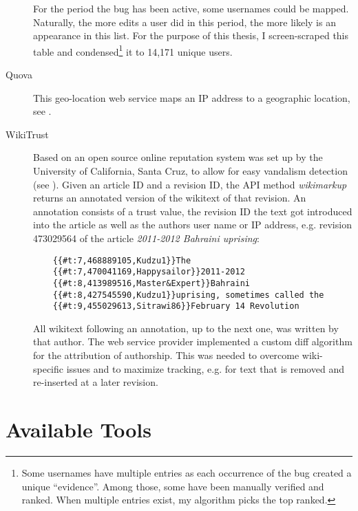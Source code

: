 \begin{description}
For the period the bug has been active, some usernames could be mapped.
Naturally, the more edits a user did in this period, the more likely is an appearance in this list.
For the purpose of this thesis, I screen-scraped this table and condensed\footnote{Some usernames have multiple entries as each occurrence of the bug created a unique ``evidence''. Among those, some have been manually verified and ranked. When multiple entries exist, my algorithm picks the top ranked.} it to 14,171 unique users.
\item[Quova] This geo-location web service maps an IP address to a geographic location, see .
\item[WikiTrust] Based on \textcite{adler2008assigning} an open source online reputation system was set up by the University of California, Santa Cruz, to allow for easy vandalism detection (see ).
Given an article ID and a revision ID, the API method \emph{wikimarkup} returns an annotated version of the wikitext of that revision.
An annotation consists of a trust value, the revision ID the text got introduced into the article as well as the authors user name or IP address, e.g. revision 473029564 of the article \emph{2011-2012 Bahraini uprising}:
\begin{lstlisting}
	{{#t:7,468889105,Kudzu1}}The 
	{{#t:7,470041169,Happysailor}}2011-2012 
	{{#t:8,413989516,Master&Expert}}Bahraini 
	{{#t:8,427545590,Kudzu1}}uprising, sometimes called the
	{{#t:9,455029613,Sitrawi86}}February 14 Revolution 
\end{lstlisting}
All wikitext following an annotation, up to the next one, was written by that author.
The web service provider implemented a custom diff algorithm for the attribution of authorship.
This was needed to overcome wiki-specific issues and to maximize tracking, e.g. for text that is removed and re-inserted at a later revision.
\end{description}


\section{Available Tools}

